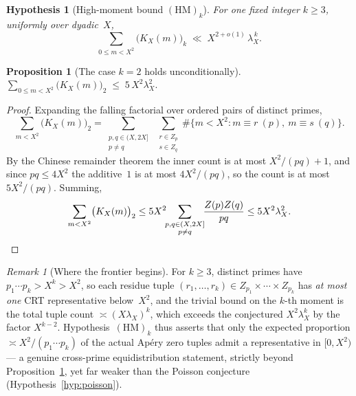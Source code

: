 \documentclass[11pt]{article}
\newtheorem{proposition}[theorem]{Proposition}
\newtheorem{hypothesis}[theorem]{Hypothesis}
\theoremstyle{definition}
\theoremstyle{remark}
\newtheorem{remark}[theorem]{Remark}
\begin{document}
\begin{hypothesis}[High-moment bound $(\mathrm{HM})_k$]
\label{hyp:high-moment}
For one fixed integer $k \ge 3$, uniformly over dyadic~$X$,
\[
  \sum_{0 \le m < X^2} \bigl(K_X(m)\bigr)_k
  \;\ll\; X^{2 + o(1)}\, \lambda_X^{\,k}.
\]
\end{hypothesis}

\begin{proposition}[The case $k = 2$ holds unconditionally]
\label{prop:hm2}
$\displaystyle
  \sum_{0 \le m < X^2} \bigl(K_X(m)\bigr)_2
  \;\le\; 5\, X^2 \lambda_X^2 .$
\end{proposition}

\begin{proof}
Expanding the falling factorial over ordered pairs of
distinct primes,
\[
  \sum_{m < X^2} \bigl(K_X(m)\bigr)_2
  = \sum_{\substack{p, q \in (X,2X] \\ p \ne q}}\
    \sum_{\substack{r \in Z_p \\ s \in Z_q}}
    \#\bigl\{m < X^2 : m \equiv r \ (p),\ m \equiv s \ (q)\bigr\}.
\]
By the Chinese remainder theorem the inner count is at most
$X^2/(pq) + 1$, and since $pq \le 4X^2$ the additive~$1$ is
at most $4X^2/(pq)$, so the count is at most $5X^2/(pq)$.
Summing,
\[
  \sum_{m<X^2}\bigl(K_X(m)\bigr)_2
  \le 5X^2 \!\!\sum_{\substack{p,q \in (X,2X] \\ p \neq q}}\!\!
  \frac{Z(p)Z(q)}{pq}
  \le 5X^2\lambda_X^2. \qedhere
\]
\end{proof}

\begin{remark}[Where the frontier begins]\label{rem:hm-frontier}
For $k \ge 3$, distinct primes have
$p_1\cdots p_k > X^k > X^2$, so each residue tuple
$(r_1, \ldots, r_k) \in Z_{p_1} \times \cdots \times Z_{p_k}$
has \emph{at most one} CRT representative below~$X^2$, and the
trivial bound on the $k$-th moment is the total tuple count
$\asymp (X\lambda_X)^k$, which exceeds the conjectured
$X^2\lambda_X^k$ by the factor $X^{k-2}$.
Hypothesis~$(\mathrm{HM})_k$ thus asserts that only the
expected proportion $\asymp X^2/(p_1 \cdots p_k)$ of the
actual Ap\'ery zero tuples admit a representative in
$[0, X^2)$ --- a genuine cross-prime equidistribution
statement, strictly beyond Proposition~\ref{prop:hm2},
yet far weaker than the Poisson conjecture
(Hypothesis~\ref{hyp:poisson}).
\end{remark}
\end{document}
